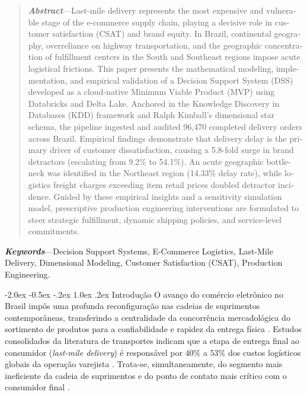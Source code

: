\documentclass[10pt,a4paper,twocolumn]{article}
\makeatletter
\renewcommand\section{\@startsection {section}{1}{\z@}%
                                   {-2.0ex \@plus -0.5ex \@minus -.2ex}%
                                   {1.0ex \@plus .2ex}%
                                   {\normalfont\large\bfseries}}
\makeatother
\begin{document}
\begin{otherlanguage}{english}
\begin{abstract}
\textbf{\textit{Abstract}}---Last-mile delivery represents the most expensive and vulnerable stage of the e-commerce supply chain, playing a decisive role in customer satisfaction (CSAT) and brand equity. In Brazil, continental geography, overreliance on highway transportation, and the geographic concentration of fulfillment centers in the South and Southeast regions impose acute logistical frictions. This paper presents the mathematical modeling, implementation, and empirical validation of a Decision Support System (DSS) developed as a cloud-native Minimum Viable Product (MVP) using Databricks and Delta Lake. Anchored in the Knowledge Discovery in Databases (KDD) framework and Ralph Kimball's dimensional star schema, the pipeline ingested and audited 96,470 completed delivery orders across Brazil. Empirical findings demonstrate that delivery delay is the primary driver of customer dissatisfaction, causing a 5.8-fold surge in brand detractors (escalating from 9.2\% to 54.1\%). An acute geographic bottleneck was identified in the Northeast region (14.33\% delay rate), while logistics freight charges exceeding item retail prices doubled detractor incidence. Guided by these empirical insights and a sensitivity simulation model, prescriptive production engineering interventions are formulated to steer strategic fulfillment, dynamic shipping policies, and service-level commitments.
\end{abstract}

\noindent\textbf{\textit{Keywords}}---Decision Support Systems, E-Commerce Logistics, Last-Mile Delivery, Dimensional Modeling, Customer Satisfaction (CSAT), Production Engineering.
\end{otherlanguage}

\section{Introdução}
O avanço do comércio eletrônico no Brasil impôs uma profunda reconfiguração nas cadeias de suprimentos contemporâneas, transferindo a centralidade da concorrência mercadológica do sortimento de produtos para a confiabilidade e rapidez da entrega física \citep{matos2025,silva2023gestao}. Estudos consolidados da literatura de transportes indicam que a etapa de entrega final ao consumidor (\textit{last-mile delivery}) é responsável por $40\%$ a $53\%$ dos custos logísticos globais da operação varejista \citep{gevaers2014cost,chopra2016supply}. Trata-se, simultaneamente, do segmento mais ineficiente da cadeia de suprimentos e do ponto de contato mais crítico com o consumidor final \citep{esper2003impact}.
\end{document}
